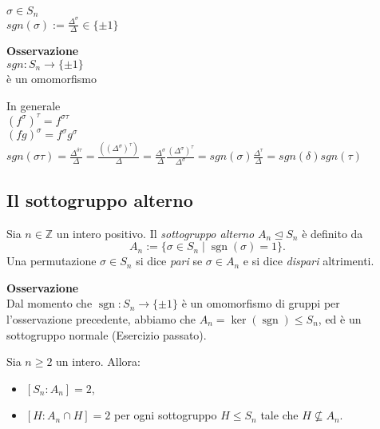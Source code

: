 \documentclass[12px]{article}
\begin{document}
	\begin{defi}
		$\sigma\in S_n$\\
		$sgn(\sigma) := \frac {\Delta^\sigma}\Delta\in\{\pm 1\}$\\
	\end{defi}
		 \textbf{Osservazione}\\
		 $sgn: S_n \rightarrow \{\pm 1\}$ \\
		 è un omomorfismo\\
		 \begin{dimo}
		 	In generale\\
			$(f^\sigma)^\tau = f^{\sigma\tau}$\\
			 $(fg)^\sigma = f^\sigma g^\sigma$\\
			 $\displaystyle sgn(\sigma\tau)=\frac {\Delta^{\delta\tau}}\Delta = \frac {((\Delta^\sigma)^\tau)} \Delta = \frac {\Delta^\sigma}{\Delta} \frac {(\Delta^\sigma)^\tau}{\Delta^\sigma} = sgn(\sigma)\frac{\Delta^\tau}\Delta = sgn(\delta)sgn(\tau)$
		 \end{dimo}
		 \subsection{Il sottogruppo alterno}

\begin{defi}
Sia $n \in \mathbb{Z}$ un intero positivo. Il \emph{sottogruppo alterno} $A_n \trianglelefteq S_n$ è definito da
\[
A_n := \{\sigma \in S_n \mid \operatorname{sgn}(\sigma) = 1 \}.
\]
Una permutazione $\sigma \in S_n$ si dice \emph{pari} se $\sigma \in A_n$ e si dice \emph{dispari} altrimenti.
\end{defi}
\textbf{Osservazione}\\
Dal momento che $\operatorname{sgn}: S_n \to \{\pm 1\}$ è un omomorfismo di gruppi per l'osservazione precedente,
abbiamo che $A_n = \ker(\operatorname{sgn}) \leq S_n$, ed è un sottogruppo normale (Esercizio passato).

\begin{prop}
Sia $n \geq 2$ un intero. Allora:
\begin{itemize}
    \item $[S_n : A_n] = 2$,
    \item $[H : A_n \cap H] = 2$ per ogni sottogruppo $H \leq S_n$ tale che $H \not\subseteq A_n$.
\end{itemize}
\end{prop}
\end{document}
